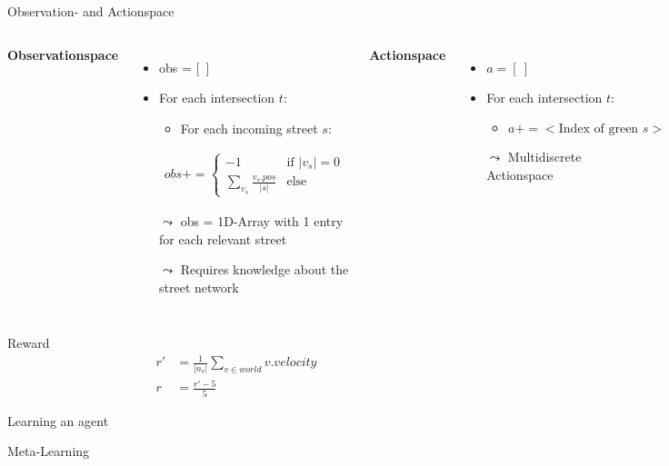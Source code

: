 \documentclass[aspectratio=43,t,xcolor={usenames,dvipsnames}]{beamer}
\begin{document}
    \begin{frame}[c]{Observation- and Actionspace}
        \begin{columns}
            \textbf{Observationspace}
            \begin{itemize}
                \item obs = [~]
                \item For each intersection $t$:
                \begin{itemize}
                    \item For each incoming street $s$:
                \end{itemize}
                \begin{align*}
                    obs += \begin{cases}
                               -1                            & \text{if } |v_s| = 0\\
                               \sum_{v_s} \frac{v_s.pos}{|s|} & \text{else}
                    \end{cases}
                \end{align*}
                \item[$\leadsto$] obs = 1D-Array with 1 entry for each relevant street
                \item[$\leadsto$] Requires knowledge about the street network
            \end{itemize}
            \pause

            \textbf{Actionspace}
            \begin{itemize}
                \item $a = [~]$
                \item For each intersection $t$:
                \begin{itemize}
                    \item $a += <\text{Index of green }s>$
                \end{itemize}
                \item[$\leadsto$] Multidiscrete Actionspace
            \end{itemize}


        \end{columns}
    \end{frame}


    \begin{frame}[c]{Reward}
        \begin{align*}
            r' &= \frac{1}{|n_v|} \sum_{v \in world} v.velocity \\
            r &= \frac{r'-5}{5}
        \end{align*}
    \end{frame}


    \begin{frame}[c]{Learning an agent}

    \end{frame}


    \begin{frame}[c]{Meta-Learning}

    \end{frame}
\end{document}
